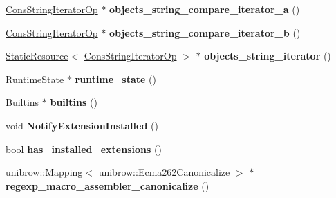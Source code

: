 \begin{DoxyCompactItemize}
\item 
\hypertarget{classv8_1_1internal_1_1_isolate_ab2bded9ebd53efe2f4f00652a4b37ae1}{}\hyperlink{classv8_1_1internal_1_1_cons_string_iterator_op}{Cons\+String\+Iterator\+Op} $\ast$ {\bfseries objects\+\_\+string\+\_\+compare\+\_\+iterator\+\_\+a} ()\label{classv8_1_1internal_1_1_isolate_ab2bded9ebd53efe2f4f00652a4b37ae1}

\item 
\hypertarget{classv8_1_1internal_1_1_isolate_a237eee7a174077f8e8071fcb0d98b4d4}{}\hyperlink{classv8_1_1internal_1_1_cons_string_iterator_op}{Cons\+String\+Iterator\+Op} $\ast$ {\bfseries objects\+\_\+string\+\_\+compare\+\_\+iterator\+\_\+b} ()\label{classv8_1_1internal_1_1_isolate_a237eee7a174077f8e8071fcb0d98b4d4}

\item 
\hypertarget{classv8_1_1internal_1_1_isolate_a04400b06219f5392622c4ab9b05cdce7}{}\hyperlink{classv8_1_1internal_1_1_static_resource}{Static\+Resource}$<$ \hyperlink{classv8_1_1internal_1_1_cons_string_iterator_op}{Cons\+String\+Iterator\+Op} $>$ $\ast$ {\bfseries objects\+\_\+string\+\_\+iterator} ()\label{classv8_1_1internal_1_1_isolate_a04400b06219f5392622c4ab9b05cdce7}

\item 
\hypertarget{classv8_1_1internal_1_1_isolate_a22f364d364fb4d61f68aa25f06951305}{}\hyperlink{classv8_1_1internal_1_1_runtime_state}{Runtime\+State} $\ast$ {\bfseries runtime\+\_\+state} ()\label{classv8_1_1internal_1_1_isolate_a22f364d364fb4d61f68aa25f06951305}

\item 
\hypertarget{classv8_1_1internal_1_1_isolate_a6cb0edf57f829ea37a9a48a3e6bc007d}{}\hyperlink{classv8_1_1internal_1_1_builtins}{Builtins} $\ast$ {\bfseries builtins} ()\label{classv8_1_1internal_1_1_isolate_a6cb0edf57f829ea37a9a48a3e6bc007d}

\item 
\hypertarget{classv8_1_1internal_1_1_isolate_ad5d9dd051fe77c6320e22521c8a71a1d}{}void {\bfseries Notify\+Extension\+Installed} ()\label{classv8_1_1internal_1_1_isolate_ad5d9dd051fe77c6320e22521c8a71a1d}

\item 
\hypertarget{classv8_1_1internal_1_1_isolate_a250bee1953bc5af406e1178c175c7912}{}bool {\bfseries has\+\_\+installed\+\_\+extensions} ()\label{classv8_1_1internal_1_1_isolate_a250bee1953bc5af406e1178c175c7912}

\item 
\hypertarget{classv8_1_1internal_1_1_isolate_ac2eb3ba336b107b317155072ed447f1b}{}\hyperlink{classunibrow_1_1_mapping}{unibrow\+::\+Mapping}$<$ \hyperlink{structunibrow_1_1_ecma262_canonicalize}{unibrow\+::\+Ecma262\+Canonicalize} $>$ $\ast$ {\bfseries regexp\+\_\+macro\+\_\+assembler\+\_\+canonicalize} ()\label{classv8_1_1internal_1_1_isolate_ac2eb3ba336b107b317155072ed447f1b}


\end{DoxyCompactItemize}
